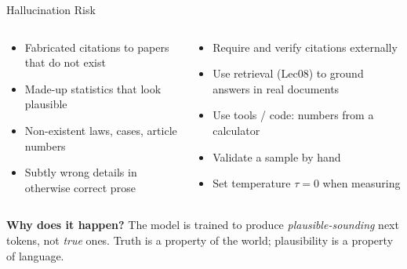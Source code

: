 \documentclass[10pt,english,aspectratio=169]{beamer}
\begin{document}
\begin{frame}{Hallucination Risk}
\begin{columns}[T]
\begin{tcolorbox}[colback=red!5, colframe=red!50!black, title=\textbf{What it looks like}]
\small
\begin{itemize}
\item Fabricated citations to papers that do not exist
\item Made-up statistics that look plausible
\item Non-existent laws, cases, article numbers
\item Subtly wrong details in otherwise correct prose
\end{itemize}
\end{tcolorbox}

\begin{tcolorbox}[colback=green!5, colframe=green!40!black, title=\textbf{Mitigations}]
\small
\begin{itemize}
\item Require and verify citations externally
\item Use retrieval (Lec08) to ground answers in real documents
\item Use tools / code: numbers from a calculator
\item Validate a sample by hand
\item Set temperature $\tau = 0$ when measuring
\end{itemize}
\end{tcolorbox}
\end{columns}

\medskip
\small\textbf{Why does it happen?} The model is trained to produce \emph{plausible-sounding} next tokens, not \emph{true} ones. Truth is a property of the world; plausibility is a property of language.
\end{frame}
\end{document}
